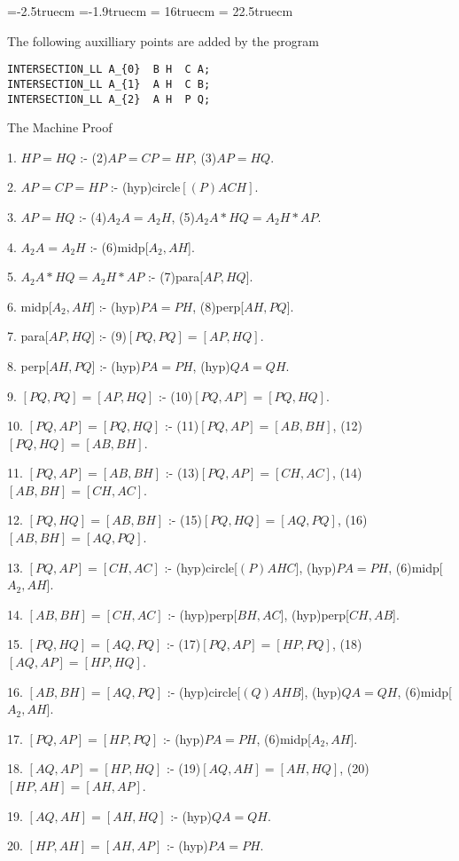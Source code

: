 \voffset=-2.5truecm
\hoffset=-1.9truecm
\textwidth = 16truecm
\textheight = 22.5truecm
\parskip=8pt
\parindent=15pt
\def\fa#1#2{\langle{#1},{#2}\rangle}

The following auxilliary points are added by the program

\begin{verbatim}
INTERSECTION_LL A_{0}  B H  C A;
INTERSECTION_LL A_{1}  A H  C B;
INTERSECTION_LL A_{2}  A H  P Q;
\end{verbatim}


{\vskip6pt \parskip=6pt \parindent=10pt 
The Machine Proof


1. $HP = HQ$ :- (2)$AP = CP = HP $, (3)$AP = HQ $.

2. $AP = CP = HP $ :- (hyp)circle$[(P)ACH]$.

3. $AP = HQ $ :- (4)$A_{2}A = A_{2}H$, (5)$A_{2}A*HQ = A_{2}H*AP$.

4. $A_{2}A = A_{2}H$ :- (6)midp[$A_{2},AH$].

5. $A_{2}A*HQ = A_{2}H*AP$ :- (7)para[$AP,HQ$].

6. midp[$A_{2},AH$] :- (hyp)$PA = PH$, (8)perp[$AH,PQ$].

7. para[$AP,HQ$] :- (9)$[PQ,PQ]=[AP,HQ]$.

8. perp[$AH,PQ$] :- (hyp)$PA = PH$, (hyp)$QA = QH$.

9. $[PQ,PQ]=[AP,HQ]$ :- (10)$[PQ,AP]=[PQ,HQ]$.

10. $[PQ,AP]=[PQ,HQ]$ :- (11)$[PQ,AP]=[AB,BH]$, (12)$[PQ,HQ]=[AB,BH]$.

11. $[PQ,AP]=[AB,BH]$ :- (13)$[PQ,AP]=[CH,AC]$, (14)$[AB,BH]=[CH,AC]$.

12. $[PQ,HQ]=[AB,BH]$ :- (15)$[PQ,HQ]=[AQ,PQ]$, (16)$[AB,BH]=[AQ,PQ]$.

13. $[PQ,AP]=[CH,AC]$ :- (hyp)circle[$(P)AHC$], (hyp)$PA = PH$, (6)midp[$A_{2},AH$].

14. $[AB,BH]=[CH,AC]$ :- (hyp)perp[$BH,AC$], (hyp)perp[$CH,AB$].

15. $[PQ,HQ]=[AQ,PQ]$ :- (17)$[PQ,AP]=[HP,PQ]$, (18)$[AQ,AP]=[HP,HQ]$.

16. $[AB,BH]=[AQ,PQ]$ :- (hyp)circle[$(Q)AHB$], (hyp)$QA = QH$, (6)midp[$A_{2},AH$].

17. $[PQ,AP]=[HP,PQ]$ :- (hyp)$PA = PH$, (6)midp[$A_{2},AH$].

18. $[AQ,AP]=[HP,HQ]$ :- (19)$[AQ,AH]=[AH,HQ]$, (20)$[HP,AH]=[AH,AP]$.

19. $[AQ,AH]=[AH,HQ]$ :- (hyp)$QA = QH$.

20. $[HP,AH]=[AH,AP]$ :- (hyp)$PA = PH$.
}

